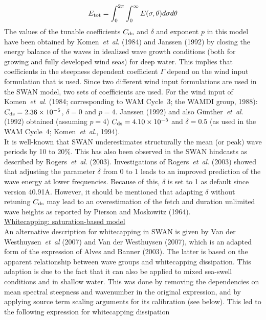 \documentclass[12pt]{book}
\begin{document}
\begin{equation}
  E_{\rm tot} = \int_{0}^{2\pi} \int_{0}^{\infty} E(\sigma,\theta)d\sigma d\theta
  \label{eq3-16}
\end{equation}
The values of the tunable coefficients $C_{\rm ds}$ and $\delta$ and exponent $p$ in this model have been obtained by
Komen~{\it et~al}. (1984) and Janssen (1992) by closing the energy balance of the waves in idealized wave growth conditions
(both for growing and fully developed wind seas) for deep water. This implies that coefficients in the steepness dependent
coefficient $\Gamma$ depend on the wind input formulation that is used. Since two different wind input formulations are
used in the SWAN model, two sets of coefficients are used. For the wind input of Komen~{\it et~al}. (1984; corresponding to WAM
Cycle~3; the WAMDI group, 1988): $C_{\rm ds} = 2.36 \times 10^{-5}$, $\delta=0$ and $p=4$. Janssen (1992) and also
G\"{u}nther~{\it et~al}. (1992) obtained (assuming $p=4$) $C_{\rm ds} = 4.10 \times 10^{-5}$ and $\delta=0.5$ (as used in the WAM
Cycle~4; Komen~{\it et~al}., 1994).
\\[2ex]
It is well-known that SWAN underestimates structurally the mean (or peak) wave periods by 10 to 20\%.
This has also been observed in the SWAN hindcasts
as described by Rogers~{\it et~al}. (2003). Investigations of Rogers~{\it et~al}. (2003) showed that adjusting the parameter $\delta$
from 0 to 1 leads to an improved prediction of the wave energy at lower frequencies.
Because of this, $\delta$ is set to 1 as default since version 40.91A.
However, it should be mentioned that adapting
$\delta$ without retuning
$C_{\rm ds}$ may lead to an overestimation of the fetch and duration unlimited wave heights as reported by
Pierson and Moskowitz (1964).
\\[2ex]
\noindent
\underline{Whitecapping: saturation-based model}\\[2ex]
An alternative description for whitecapping in SWAN is given by Van der Westhuysen~{\it et~al} (2007) and
Van der Westhuysen (2007), which is an adapted form of the expression of Alves and Banner (2003). The latter is based
on the apparent relationship between wave groups and whitecapping dissipation. This adaption is due to the fact that it
can also be applied to mixed sea-swell conditions and in shallow water. This was done by removing the dependencies on mean
spectral steepness and wavenumber in the original expression, and by applying source term scaling arguments for its
calibration (see below). This led to the following expression for whitecapping dissipation
\end{document}
